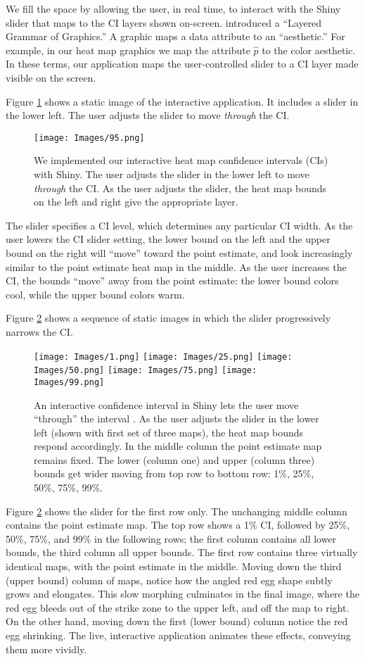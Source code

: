 We fill the space by allowing the user, in real time, to interact with the Shiny slider that maps to the CI layers shown on-screen. \cite{Wickham2010} introduced a ``Layered Grammar of Graphics.'' A graphic maps a data attribute to an ``aesthetic.'' For example, in our heat map graphics we map the attribute $\hat{p}$ to the color aesthetic. In these terms, our application maps the user-controlled slider to a CI layer made visible on the screen. 

Figure \ref{fig:Shiny} shows a static image of the interactive application. It includes a slider in the lower left. The user adjusts the slider to move {\it through} the CI.
  \begin{figure}[H]
	\centering
	\texttt{[image: Images/95.png]}
	\caption{We implemented our interactive heat map confidence intervals (CIs) with Shiny. The user adjusts the slider in the lower left to move {\it through} the CI. As the user adjusts the slider, the heat map bounds on the left and right give the appropriate layer.}
	\label{fig:Shiny}
	\end{figure}
The slider specifies a CI level, which determines any particular CI width. As the user lowers the CI slider setting, the lower bound on the left and the upper bound on the right will ``move'' toward the point estimate, and look increasingly similar to the point estimate heat map in the middle. As the user increases the CI, the bounds ``move'' away from the point estimate: the lower bound colors cool, while the upper bound colors warm.

Figure \ref{fig:sequence} shows a sequence of static images in which the slider progressively narrows the CI.
  \begin{figure}[H]
	\centering
	\texttt{[image: Images/1.png]}
	\texttt{[image: Images/25.png]}
	\texttt{[image: Images/50.png]}
	\texttt{[image: Images/75.png]}
	\texttt{[image: Images/99.png]}
	\caption{An interactive confidence interval in Shiny lets the user move ``through'' the interval \citep{Shiny}. As the user adjusts the slider in the lower left (shown with first set of three maps), the heat map bounds respond accordingly. In the middle column the point estimate map remains fixed. The lower (column one) and upper (column three) bounds get wider moving from top row to bottom row: 1\%, 25\%, 50\%, 75\%, 99\%.}
	\label{fig:sequence}
	\end{figure}
Figure \ref{fig:sequence} shows the slider for the first row only. The unchanging middle column contains the point estimate map. The top row shows a 1\% CI, followed by 25\%, 50\%, 75\%, and 99\% in the following rows; the first column contains all lower bounds, the third column all upper bounds. The first row contains three virtually identical maps, with the point estimate in the middle. Moving down the third (upper bound) column of maps, notice how the angled red egg shape subtly grows and elongates. This slow morphing culminates in the final image, where the red egg bleeds out of the strike zone to the upper left, and off the map to right. On the other hand, moving down the first (lower bound) column notice the red egg shrinking. The live, interactive application animates these effects, conveying them more vividly.

